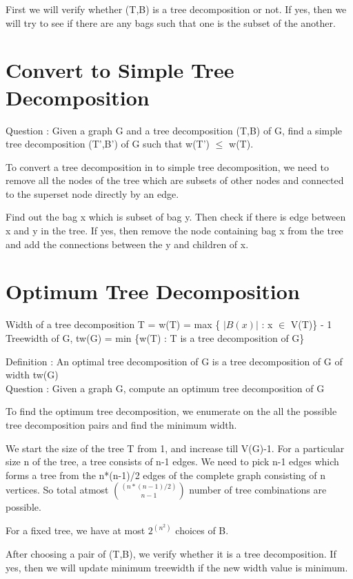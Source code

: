 First we will verify whether (T,B) is a tree decomposition or not. If yes,
then we will try to see if there are any bags such that one is the subset of the another.

\section{Convert to Simple Tree Decomposition}
Question : Given a graph G and a tree decomposition (T,B) of G, 
find a simple tree decomposition (T',B') of G such that w(T') $\leq$ w(T).

To convert a tree decomposition in to simple tree decomposition, we need to remove 
all the nodes of the tree which are subsets of other nodes and connected to the superset node
directly by an edge.

Find out the bag x which is subset of bag y. Then check if there is edge between x and y in the
tree. If yes, then remove the node containing bag x from the tree and add the connections between 
the y and children of x.  

\section{Optimum Tree Decomposition}
Width of a tree decomposition T = w(T) = max \{ $|B(x)|$ : x $\in$ V(T)\} - 1 \\
Treewidth of G, tw(G) = min \{w(T) : T is a tree decomposition of G\} 


Definition : An optimal tree decomposition of G is a tree decomposition of G of width tw(G) \\
Question : Given a graph G, compute an optimum tree decomposition of G

To find the optimum tree decomposition, we enumerate on the all the possible tree decomposition
pairs and find the minimum width.

We start the size of the tree T from 1, and increase till V(G)-1.
For a particular size n of the tree, a tree consists of n-1 edges. We need to pick n-1 edges
which forms a tree from the n*(n-1)/2 edges of the complete graph consisting of n vertices. So total 
atmost 
$\binom{(n*(n-1)/2)}{n-1}$ number of tree combinations are possible. 

For a fixed tree, we have at most $2^{(n^2)}$ choices of B. 

After choosing a pair of (T,B), we verify whether it is a tree decomposition. If yes, then we will 
update minimum treewidth if the new width value is minimum.


